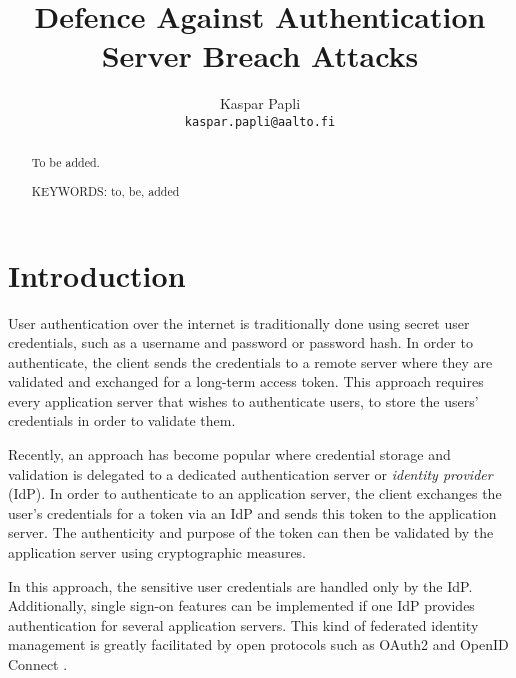 \documentclass[article]{aaltoseries}
\begin{document}
 

\title{Defence Against Authentication Server Breach Attacks}

\author{Kaspar Papli
\\\textnormal{\texttt{kaspar.papli@aalto.fi}}}


\maketitle


\begin{abstract}
To be added.

\vspace{3mm}
\noindent KEYWORDS: to, be, added

\end{abstract}




\section{Introduction}

User authentication over the internet is traditionally done using secret user credentials, such as a username and password or password hash. In order to authenticate, the client sends the credentials to a remote server where they are validated and exchanged for a long-term access token. This approach requires every application server that wishes to authenticate users, to store the users' credentials in order to validate them.

Recently, an approach has become popular where credential storage and validation is delegated to a dedicated authentication server or \textit{identity provider} (IdP). In order to authenticate to an application server, the client exchanges the user's credentials for a token via an IdP and sends this token to the application server. The authenticity and purpose of the token can then be validated by the application server using cryptographic measures.

In this approach, the sensitive user credentials are handled only by the IdP. Additionally, single sign-on features can be implemented if one IdP provides authentication for several application servers. This kind of federated identity management is greatly facilitated by open protocols such as OAuth2 \cite{oauth2} and OpenID Connect \cite{oidc}.
\end{document}

